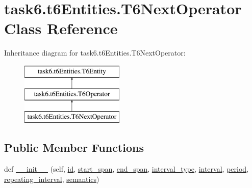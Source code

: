 \hypertarget{classtask6_1_1t6Entities_1_1T6NextOperator}{}\section{task6.\+t6\+Entities.\+T6\+Next\+Operator Class Reference}
\label{classtask6_1_1t6Entities_1_1T6NextOperator}
Inheritance diagram for task6.\+t6\+Entities.\+T6\+Next\+Operator\+:\begin{figure}[H]
\begin{center}
\leavevmode
\includegraphics[height=3.000000cm]{classtask6_1_1t6Entities_1_1T6NextOperator}
\end{center}
\end{figure}
\subsection*{Public Member Functions}
\begin{DoxyCompactItemize}
\item 
def \hyperlink{classtask6_1_1t6Entities_1_1T6NextOperator_a52ca482e1fb78073e0bfaa804558846d}{\+\_\+\+\_\+init\+\_\+\+\_\+} (self, \hyperlink{classtask6_1_1t6Entities_1_1T6Entity_afeeced8134bb3ebe0cfecc64d0ab46a4}{id}, \hyperlink{classtask6_1_1t6Entities_1_1T6Entity_a52779e9af8864dc98e8b02fc5b9b041a}{start\+\_\+span}, \hyperlink{classtask6_1_1t6Entities_1_1T6Entity_aeb402200b156cd9562c5111dfe777b98}{end\+\_\+span}, \hyperlink{classtask6_1_1t6Entities_1_1T6NextOperator_a28e1b4345fea8b5436687c45d6daf2a9}{interval\+\_\+type}, \hyperlink{classtask6_1_1t6Entities_1_1T6NextOperator_a4059079dc037d178dbda878e60051ba0}{interval}, \hyperlink{classtask6_1_1t6Entities_1_1T6NextOperator_acc493ea5fb1baf65832d630812ae7299}{period}, \hyperlink{classtask6_1_1t6Entities_1_1T6NextOperator_a66a96468dd1b550691e461d897c05c99}{repeating\+\_\+interval}, \hyperlink{classtask6_1_1t6Entities_1_1T6NextOperator_a2d4bc12cdc90894fb48afc39adb4ffab}{semantics})
\end{DoxyCompactItemize}
